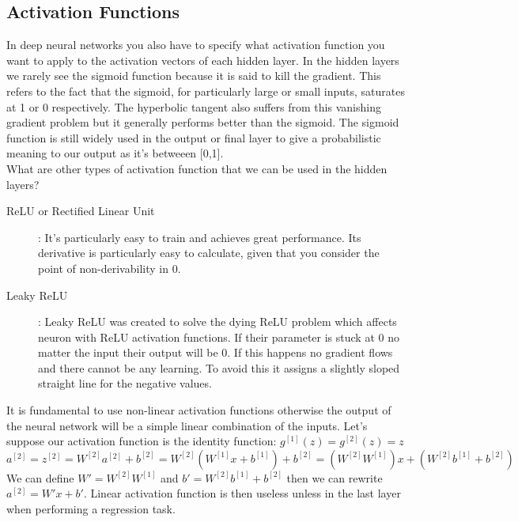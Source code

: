 \documentclass{article}
\begin{document}
\subsection{Activation Functions}
In deep neural networks you also have to specify what activation function you want to apply to the activation vectors of each hidden layer. In the hidden layers we rarely see the sigmoid function because it is said to kill the gradient. This refers to the fact that the sigmoid, for particularly large or small inputs, saturates at 1 or 0 respectively. The hyperbolic tangent also suffers from this vanishing gradient problem but it generally performs better than the sigmoid. The sigmoid function is still widely used in the output or final layer to give a probabilistic meaning to our output as it's betweeen [0,1].\\
What are other types of activation function that we can be used in the hidden layers?
\begin{description}
    \item[ReLU or Rectified Linear Unit]:
        It's particularly easy to train and achieves great performance. Its derivative is particularly easy to calculate, given that you consider the point of non-derivability in 0. 
    \item[Leaky ReLU]: Leaky ReLU was created to solve the dying ReLU problem which affects neuron with ReLU activation functions. If their parameter is stuck at 0 no matter the input their output will be 0. If this happens no gradient flows and there cannot be any learning. To avoid this it assigns a slightly sloped straight line for the negative values.
\end{description}
It is fundamental to use non-linear activation functions otherwise the output of the neural network will be a simple linear combination of the inputs. Let's suppose our activation function is the identity function: $ g^{[1]}(z) = g^{[2]}(z) = z $ 
\[ 
    a^{[2]} = z^{[2]}= W^{[2]}a^{[2]}+b^{[2]} =  W^{[2]}(W^{[1]}x+b^{[1]})+b^{[2]} = (W^{[2]}W^{[1]})x + (W^{[2]}b^{[1]}+b^{[2]})
\]
We can define $ W' = W^{[2]}W^{[1]} $ and $ b'= W^{[2]}b^{[1]}+b^{[2]}$ then we can rewrite $ a^{[2]} = W'x +b'$. Linear activation function is then useless unless in the last layer when performing a regression task.
\end{document}
